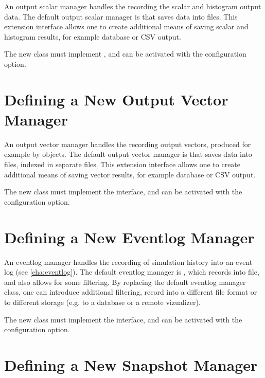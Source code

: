 An output scalar manager handles the recording the scalar and histogram
output data. The default output scalar manager is
 that saves data into  files.
This extension interface allows one to create additional means of saving
scalar and histogram results, for example database or CSV output.

The new class must implement , and can be
activated with the  configuration
option.


\section{Defining a New Output Vector Manager}
\label{sec:plugin-exts:outputvectormanager}

An output vector manager handles the recording output vectors, produced
for example by  objects. The default output vector
manager is  that saves data into
 files, indexed in separate  files. This extension
interface allows one to create additional means of saving vector results,
for example database or CSV output.

The new class must implement the  interface,
and can be activated with the 
configuration option.


\section{Defining a New Eventlog Manager}
\label{sec:plugin-exts:eventlogmanager}

An eventlog manager handles the recording of simulation history into an
event log (see \ref{cha:eventlog}). The default eventlog manager is
, which records into file, and also allows for
some filtering. By replacing the default eventlog manager class, one can
introduce additional filtering, record into a different file format or
to different storage (e.g. to a database or a remote vizualizer).

The new class must implement the  interface,
and can be activated with the  configuration
option.


\section{Defining a New Snapshot Manager}
\label{sec:plugin-exts:snapshotmanager}

